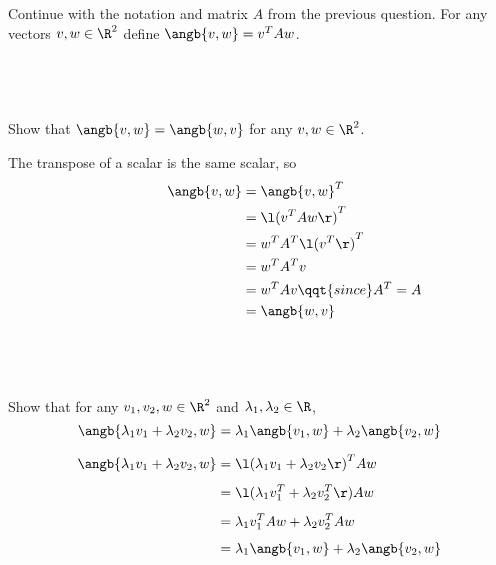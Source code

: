 \documentclass[a4paper]{article}
\begin{document}
\begin{questionbody}
Continue with the notation and matrix $A$ from the previous question. For any vectors $v, w \in \R^2$ define $\angb{v,w} = v^T A w$.
\end{questionbody}

\subsection{~} %

\begin{questionbody}
Show that $\angb{v, w} = \angb{w, v}$ for any $v, w \in \R^2$.
\end{questionbody}

The transpose of a scalar is the same scalar, so \begin{align*}
\quad\qquad\qquad \angb{v, w} &= \angb{v, w}^T \\
&= {\l( v^T A w \r)}^T \\
&= w^T A^T {\l( v^T \r)}^T \\
&= w^T A^T v \\
&= w^T A v \qqt{since }A^T = A \\
&= \angb{w, v}
\end{align*}

\subsection{~} %

\begin{questionbody}
Show that for any $v_1, v_2, w \in \R^2$ and $\lambda_1, \lambda_2 \in \R$, \[
\angb{\lambda_1 v_1 + \lambda_2 v_2, w} = \lambda_1 \angb{v_1, w} + \lambda_2 \angb{v_2, w}
\]
\end{questionbody}

\begin{align*}
\angb{\lambda_1 v_1 + \lambda_2 v_2, w} &= {\l(\lambda_1 v_1 + \lambda_2 v_2\r)}^T A w \\[1ex]
&= \l(\lambda_1 v_1^T + \lambda_2 v_2^T\r) A w \\[1ex]
&= \lambda_1 v_1^T A w + \lambda_2 v_2^T A w \\[1ex]
&= \lambda_1 \angb{v_1, w} + \lambda_2 \angb{v_2, w}
\end{align*}

\subsection{~} %
\end{document}
